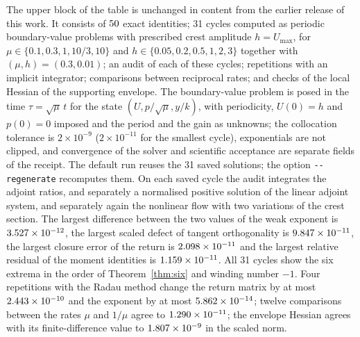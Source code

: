 \begin{table}[ht]
\centering\footnotesize
\caption{Executed checks. The upper block accompanies Sections~\ref{sec:adjoint}--\ref{sec:geometry}, \ref{sec:compact}, \ref{sec:obstruction} and Appendix~\ref{app:hopf}; the lower block accompanies Sections~\ref{sec:gauges}--\ref{sec:attractor} and \ref{sec:largegain}--\ref{sec:negative}. The units differ from row to row, and the rows are not independent: several reuse the same computed cycles. No count is a probability that a theorem is correct.}\label{num:tab:counts}

\end{table}

The upper block of the table is unchanged in content from the earlier release of this work. It consists of $50$ exact identities; 31 cycles computed as periodic boundary-value problems with prescribed crest amplitude $h=U_{\max}$, for $\mu\in\{0.1,0.3,1,10/3,10\}$ and $h\in\{0.05,0.2,0.5,1,2,3\}$ together with $(\mu,h)=(0.3,0.01)$; an audit of each of these cycles; repetitions with an implicit integrator; comparisons between reciprocal rates; and checks of the local Hessian of the supporting envelope. The boundary-value problem is posed in the time $\tau=\sqrt\mu\,t$ for the state $(U,p/\sqrt\mu,y/k)$, with periodicity, $U(0)=h$ and $p(0)=0$ imposed and the period and the gain as unknowns; the collocation tolerance is $2\times10^{-9}$ ($2\times10^{-11}$ for the smallest cycle), exponentials are not clipped, and convergence of the solver and scientific acceptance are separate fields of the receipt. The default run reuses the 31 saved solutions; the option \texttt{-{}-regenerate} recomputes them. On each saved cycle the audit integrates the adjoint ratios, and separately a normalised positive solution of the linear adjoint system, and separately again the nonlinear flow with two variations of the crest section. The largest difference between the two values of the weak exponent is $3.527\times10^{-12}$, the largest scaled defect of tangent orthogonality is $9.847\times10^{-11}$, the largest closure error of the return is $2.098\times10^{-11}$ and the largest relative residual of the moment identities is $1.159\times10^{-11}$. All 31 cycles show the six extrema in the order of Theorem~\ref{thm:six} and winding number $-1$. Four repetitions with the Radau method change the return matrix by at most $2.443\times10^{-10}$ and the exponent by at most $5.862\times10^{-14}$; twelve comparisons between the rates $\mu$ and $1/\mu$ agree to $1.290\times10^{-11}$; the envelope Hessian agrees with its finite-difference value to $1.807\times10^{-9}$ in the scaled norm.

